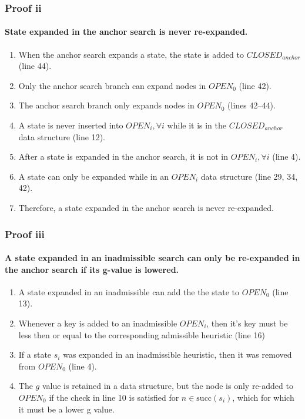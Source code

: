 \documentclass[11pt,letter]{article}
\begin{document}
\subsubsection{Proof ii}
\paragraph{State expanded in the anchor search is never re-expanded.}

\begin{enumerate}
    \item When the anchor search expands a state, the state is added to $CLOSED_{anchor}$ (line 44).
    \item Only the anchor search branch can expand nodes in $OPEN_0$ (line 42).
    \item The anchor search branch only expands nodes in $OPEN_0$ (lines 42--44).
    \item A state is never inserted into $OPEN_i, \forall i$ while it is in the $CLOSED_{anchor}$ data structure (line 12).
    \item After a state is expanded in the anchor search, it is not in $OPEN_i, \forall i$ (line 4).
    \item A state can only be expanded while in an $OPEN_i$ data structure (line 29, 34, 42).
    \item Therefore, a state expanded in the anchor search is never re-expanded.
\end{enumerate}

\subsubsection{Proof iii}
\paragraph{A state expanded in an inadmissible search can only be re-expanded in the anchor search if its g-value is lowered.}

\begin{enumerate}
    \item A state expanded in an inadmissible can add the the state to $OPEN_0$ (line 13).
    \item Whenever a key is added to an inadmissible $OPEN_i$, then it's key must be less then or equal to the corresponding admissible heuristic (line 16)
    \item If a state $s_i$ was expanded in an inadmissible heuristic, then it was removed from $OPEN_0$ (line 4).
    \item The $g$ value is retained in a data structure, but the node is only re-added to $OPEN_0$ if the check in line 10 is satisfied for $n \in \text{succ}(s_i)$, which for which it must be a lower g value.
\end{enumerate}
\end{document}
